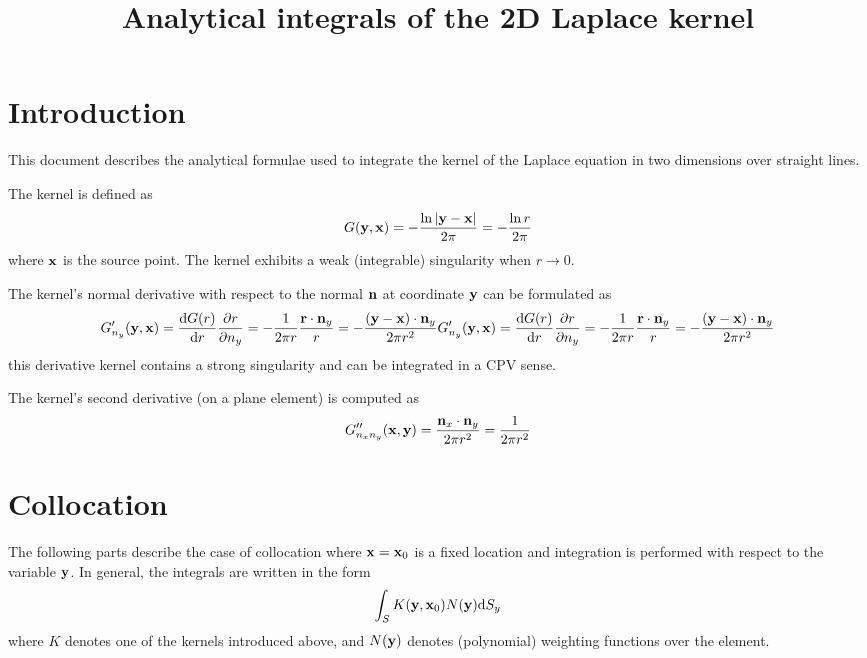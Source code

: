 \documentclass[a4paper,11pt]{article}
\title {Analytical integrals of the 2D Laplace kernel}
\newcommand{\td}{\mathrm{d}}
\begin{document}
\maketitle

\section{Introduction}

This document describes the analytical formulae used to integrate the kernel of the Laplace equation in two dimensions over straight lines.

The kernel is defined as
%
\begin{equation}
G({\bf y}, {\bf x}) = -\frac{\ln |{\bf y}-{\bf x}|}{2\pi} = -\frac{\ln r}{2\pi}
\end{equation}
%
where ${\bf x}$ is the source point. The kernel exhibits a weak (integrable) singularity when $r \to 0$.

The kernel's normal derivative with respect to the normal  ${\bf n}$ at coordinate ${\bf y}$ can be formulated as
%
\begin{equation}
G'_{n_y}({\bf y}, {\bf x}) = \frac{\td G(r)}{\td r} \frac{\partial r}{\partial n_y} = -\frac{1}{2\pi r} \frac{{\bf r} \cdot {\bf n}_y}{r} = -\frac{({\bf y}-{\bf x}) \cdot {\bf n}_y}{2\pi r^2}
G'_{n_y}({\bf y}, {\bf x}) = \frac{\td G(r)}{\td r} \frac{\partial r}{\partial n_y} = -\frac{1}{2\pi r} \frac{{\bf r} \cdot {\bf n}_y}{r} = -\frac{({\bf y}-{\bf x}) \cdot {\bf n}_y}{2\pi r^2}
\end{equation}
%
this derivative kernel contains a strong singularity and can be integrated in a CPV sense.

The kernel's second derivative (on a plane element) is computed as
%
\begin{equation}
G''_{n_x n_y}({\bf x}, {\bf y}) = \frac{{\bf n}_x \cdot {\bf n}_y}{2\pi r^2} = \frac{1}{2\pi r^2}
\end{equation}


\section{Collocation}

The following parts describe the case of collocation where ${\bf x}={\bf x}_0$ is a fixed location and integration is performed with respect to the variable ${\bf y}$. In general, the integrals are written in the form
%
\begin{equation}
\int_S K({\bf y}, {\bf x}_0) N({\bf y}) \td S_y
\end{equation}
%
where $K$ denotes one of the kernels introduced above, and $N({\bf y})$ denotes (polynomial) weighting functions over the element.
\end{document}
